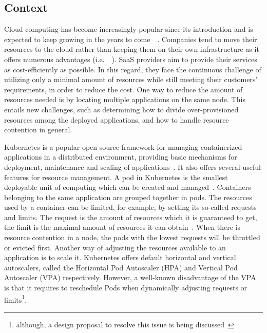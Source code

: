 \subsection{Context}
Cloud computing has become increasingly popular since its introduction and is expected to keep growing in the years to come~~\citep{Statista.com}. Companies tend to move their resources to the cloud rather than keeping them on their own infrastructure as it offers numerous advantages (i.e.~~\citep{AhmadiM.2018Caao}). SaaS providers aim to provide their services as cost-efficiently as possible. In this regard, they face the continuous challenge of utilizing only a minimal amount of resources while still meeting their customers' requirements, in order to reduce the cost. One way to reduce the amount of resources needed is by locating multiple applications on the same node. This entails new challenges, such as determining how to divide over-provisioned resources among the deployed applications, and how to handle resource contention in general. 

Kubernetes is a popular open source framework for managing containerized applications in a distributed environment, providing basic mechanisms for deployment, maintenance and scaling of applications~\citep{kubernetes_github}. It also offers several useful features for resource management. 
A pod in Kubernetes is the smallest deployable unit of computing which can be created and managed~\citep{pod}. Containers belonging to the same application are grouped together in pods. 
The resources used by a container can be limited, for example, by setting its so-called requests and limits. The request is the amount of resources which it is guaranteed to get, the limit is the maximal amount of resources it can obtain~\citep{requestlimit}. When there is resource contention in a node, the pods with the lowest requests will be throttled or evicted first. Another way of adjusting the resources available to an application is to scale it. Kubernetes offers default horizontal and vertical autoscalers, called the Horizontal Pod Autoscaler (HPA) and Vertical Pod Autoscaler (VPA) respectively. However, a well-known disadvantage of the VPA is that it requires to reschedule Pods when dynamically adjusting requests or limits\footnote{although, a design proposal to resolve this issue is being discussed~\citep{in-place-pod-resources-updates}}.

